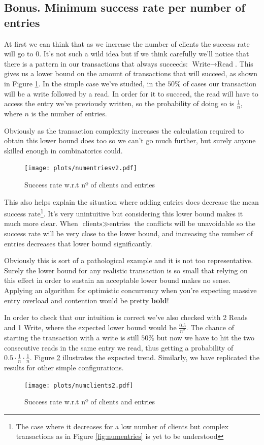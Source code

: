 \documentclass[a4paper, 10pt]{article}
\begin{document}
\clearpage
\subsection{Bonus. Minimum success rate per number of entries}
\label{sec:magia}
At first we can think that as we increase the number of clients the success rate will go to $0$. It's not such a wild idea but if we think carefully we'll notice that there is a pattern in our transactions that always succeeds: $\text{Write} \rightarrow \text{Read}$. This gives us a lower bound on the amount of transactions that will succeed, as shown in Figure \ref{fig:magia}. In the simple case we've studied, in the $50\%$ of cases our transaction will be a write followed by a read. In order for it to succeed, the read will have to access the entry we've previously written, so the probability of doing so is $\frac{1}{n}$, where $n$ is the number of entries.

Obviously as the transaction complexity increases the calculation required to obtain this lower bound does too so we can't go much further, but surely anyone skilled enough in combinatorics could.
\begin{figure}[H]
  \centering
  \texttt{[image: plots/numentriesv2.pdf]}
    \caption{Success rate w.r.t nº of clients and entries}
    \label{fig:magia}
\end{figure} 

This also helps explain the situation where adding entries does decrease the mean success rate\footnote{The case where it decreases for a low number of clients but complex transactions as in Figure \ref{fig:numentries} is yet to be understood}. It's very unintuitive but considering this lower bound makes it much more clear. When $\text{clients} \gg \text{entries}$ the conflicts will be unavoidable so the success rate will be very close to the lower bound, and increasing the number of entries decreases that lower bound significantly.

Obviously this is sort of a pathological example and it is not too representative. Surely the lower bound for any realistic transaction is so small that relying on this effect in order to sustain an acceptable lower bound makes no sense. Applying an algorithm for optimistic concurrency when you're expecting massive entry overload and contention would be pretty \textbf{bold}!

\clearpage

In order to check that our intuition is correct we've also checked with 2 Reads and 1 Write, where the expected lower bound would be $\displaystyle \frac{0.5}{n^2}$. The chance of starting the transaction with a write is still $50\%$ but now we have to hit the two consecutive reads in the same entry we read, thus getting a probability of $0.5 \cdot \frac{1}{n} \cdot \frac{1}{n}$. Figure \ref{fig:magia2} illustrates the expected trend. Similarly, we have replicated the results for other simple configurations.
\begin{figure}[H]
  \centering
  \texttt{[image: plots/numclients2.pdf]}
    \caption{Success rate w.r.t nº of clients and entries}
    \label{fig:magia2}
\end{figure} 
\end{document}
